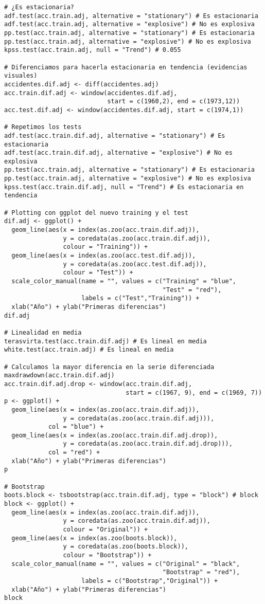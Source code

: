 \documentclass[12pt,a4paper,oneside]{article}
\begin{document}
\begin{Verbatim}[fontsize=\footnotesize]
# ¿Es estacionaria?
adf.test(acc.train.adj, alternative = "stationary") # Es estacionaria
adf.test(acc.train.adj, alternative = "explosive") # No es explosiva
pp.test(acc.train.adj, alternative = "stationary") # Es estacionaria
pp.test(acc.train.adj, alternative = "explosive") # No es explosiva
kpss.test(acc.train.adj, null = "Trend") # 0.055

# Diferenciamos para hacerla estacionaria en tendencia (evidencias visuales)
accidentes.dif.adj <- diff(accidentes.adj)
acc.train.dif.adj <- window(accidentes.dif.adj,
                            start = c(1960,2), end = c(1973,12))
acc.test.dif.adj <- window(accidentes.dif.adj, start = c(1974,1))

# Repetimos los tests
adf.test(acc.train.dif.adj, alternative = "stationary") # Es estacionaria
adf.test(acc.train.dif.adj, alternative = "explosive") # No es explosiva
pp.test(acc.train.adj, alternative = "stationary") # Es estacionaria
pp.test(acc.train.adj, alternative = "explosive") # No es explosiva
kpss.test(acc.train.dif.adj, null = "Trend") # Es estacionaria en tendencia

# Plotting con ggplot del nuevo training y el test
dif.adj <- ggplot() +
  geom_line(aes(x = index(as.zoo(acc.train.dif.adj)),
                y = coredata(as.zoo(acc.train.dif.adj)),
                colour = "Training")) +
  geom_line(aes(x = index(as.zoo(acc.test.dif.adj)),
                y = coredata(as.zoo(acc.test.dif.adj)),
                colour = "Test")) +
  scale_color_manual(name = "", values = c("Training" = "blue",
                                           "Test" = "red"),
                     labels = c("Test","Training")) +
  xlab("Año") + ylab("Primeras diferencias")
dif.adj

# Linealidad en media
terasvirta.test(acc.train.dif.adj) # Es lineal en media
white.test(acc.train.adj) # Es lineal en media

# Calculamos la mayor diferencia en la serie diferenciada
maxdrawdown(acc.train.dif.adj)
acc.train.dif.adj.drop <- window(acc.train.dif.adj,
                                 start = c(1967, 9), end = c(1969, 7))
p <- ggplot() +
  geom_line(aes(x = index(as.zoo(acc.train.dif.adj)),
                y = coredata(as.zoo(acc.train.dif.adj))),
            col = "blue") +
  geom_line(aes(x = index(as.zoo(acc.train.dif.adj.drop)),
                y = coredata(as.zoo(acc.train.dif.adj.drop))),
            col = "red") +
  xlab("Año") + ylab("Primeras diferencias")
p

# Bootstrap
boots.block <- tsbootstrap(acc.train.dif.adj, type = "block") # block
block <- ggplot() +
  geom_line(aes(x = index(as.zoo(acc.train.dif.adj)),
                y = coredata(as.zoo(acc.train.dif.adj)),
                colour = "Original")) +
  geom_line(aes(x = index(as.zoo(boots.block)),
                y = coredata(as.zoo(boots.block)),
                colour = "Bootstrap")) +
  scale_color_manual(name = "", values = c("Original" = "black",
                                           "Bootstrap" = "red"),
                     labels = c("Bootstrap","Original")) +
  xlab("Año") + ylab("Primeras diferencias")
block


\end{Verbatim}
\end{document}
